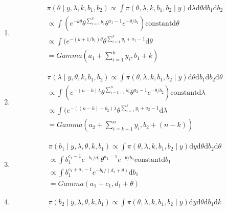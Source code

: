 \documentclass[lecture,12pt,]{pcms-l}
\numberwithin{section}{chapter}
\numberwithin{equation}{chapter}
\theoremstyle{plain}
\theoremstyle{definition}
\theoremstyle{definition}
\begin{document}
\begin{enumerate}
\item 
\begin{equation*}
\begin{split}
\pi(\theta \mid y ,\lambda,k,b_1,b_2 ) \propto \int \pi(\theta,\lambda,k,b_1,b_2 \mid y) \mathrm{d} \lambda \mathrm{d} \theta \mathrm{d} b_1 \mathrm{d} b_2 
\\
\propto \int (e^{-k\theta} \theta^{\sum_{i=1}^k y_i} \theta^{a_1 -1}e^{-\theta/b_1}) \text{constant} \mathrm{d} \theta
\\
\propto \int (e^{-(k+1/b_1)\theta} \theta^{\sum_{i=1}^k y_i+a_1-1} \mathrm{d} \theta 
\\
=Gamma(a_1 +\sum_{i=1}^k y_i, b_1+k)
\end{split}
\end{equation*}
\item 
\begin{equation*}
\begin{split}
\pi(\lambda \mid y ,\theta,k,b_1,b_2 ) \propto \int \pi(\theta,\lambda,k,b_1,b_2 \mid y) \mathrm{d}\theta \mathrm{d} b_1   \mathrm{d} b_2 \mathrm{d} \theta
\\
\propto \int (e^{-(n-k)\lambda} \theta^{\sum_{i=k+1}^n y_i} \theta^{a_2 -1}e^{-\theta/b_2}) \text{constant} \mathrm{d} \lambda
\\
\propto \int (e^{-((n-k)+b_2)\lambda} \theta^{\sum_{i=1}^k y_i+a_2-1} \mathrm{d} \lambda 
\\
=Gamma(a_2 +\sum_{i=k+1}^n y_i, b_2+(n-k))
\end{split}
\end{equation*}
\item
\begin{equation*}
\begin{split}
\pi(b_1 \mid y ,\lambda, \theta,k,b_1 ) \propto \int \pi(\theta,\lambda,k,b_1,b_2 \mid y) \mathrm{d}y \mathrm{d} \theta \mathrm{d} b_2 \mathrm{d} \theta
\\
\propto \int b_{1}^{c_1-1}e^{-b_1/d_1} \theta^{a_1-1} e^{-\theta/b_1}\text{constant} \mathrm{d} b_1
\\
\propto \int b_{1}^{c_1+a_1-1} e^{-b_1/(d_1+\theta)} \mathrm{d} b_1 
\\
=Gamma(a_1 +c_1,d_1+\theta)
\end{split}
\end{equation*}
\item
\begin{equation*}
\begin{split}
\pi(b_2 \mid y ,\lambda, \theta,k,b_1 ) \propto \int \pi(\theta,\lambda,k,b_1,b_2 \mid y) \mathrm{d}y \mathrm{d} \theta  \mathrm{d} b_1 \mathrm{d} k

\end{split}
\end{equation*}
\end{enumerate}
\end{document}
